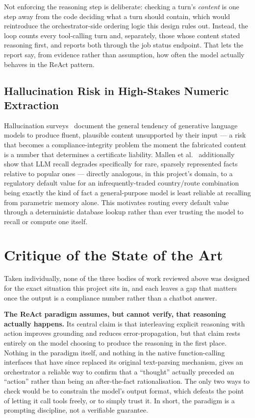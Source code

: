 Not enforcing the reasoning step is deliberate: checking a turn's
\textit{content} is one step away from the code deciding what a turn
should contain, which would reintroduce the orchestrator-side ordering
logic this design rules out. Instead, the loop counts every tool-calling
turn and, separately, those whose content stated reasoning first, and
reports both through the job status endpoint. That lets the report say,
from evidence rather than assumption, how often the model actually
behaves in the ReAct pattern.

\subsection{Hallucination Risk in High-Stakes Numeric Extraction}

Hallucination surveys~\cite{ji2023hallucination,huang2023hallucination} document the
general tendency of generative language models to produce fluent,
plausible content unsupported by their input --- a risk that becomes a
compliance-integrity problem the moment the fabricated content is a number
that determines a certificate liability. Mallen et al.~\cite{mallen2023trust}
additionally show that LLM recall degrades specifically for rare, sparsely
represented facts relative to popular ones --- directly analogous, in this
project's domain, to a regulatory default value for an
infrequently-traded country/route combination being exactly the kind of
fact a general-purpose model is least reliable at recalling from
parametric memory alone. This motivates routing every default value
through a deterministic database lookup rather than ever trusting the
model to recall or compute one itself.

\section{Critique of the State of the Art}

Taken individually, none of the three bodies of work reviewed above was
designed for the exact situation this project sits in, and each leaves a
gap that matters once the output is a compliance number rather than a
chatbot answer.

\textbf{The ReAct paradigm assumes, but cannot verify, that reasoning
actually happens.} Its central claim is that interleaving explicit
reasoning with action improves grounding and reduces error-propagation,
but that claim rests entirely on the model choosing to produce the
reasoning in the first place. Nothing in the paradigm itself, and nothing
in the native function-calling interfaces that have since replaced its
original text-parsing mechanism, gives an orchestrator a reliable way to
confirm that a ``thought'' actually preceded an ``action'' rather than
being an after-the-fact rationalisation. The only two ways to check would
be to constrain the model's output format, which defeats the point of
letting it call tools freely, or to simply trust it. In short, the
paradigm is a prompting discipline, not a verifiable guarantee.

